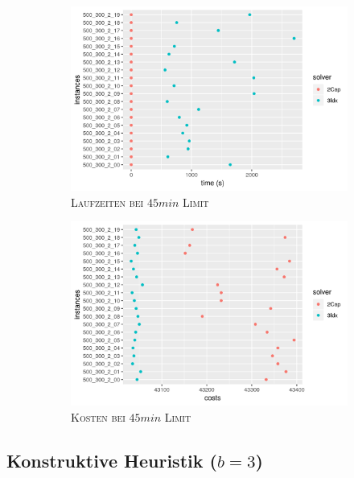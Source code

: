 \begin{figure}[H]
\centering
\begin{subfigure}[b]{0.4\textwidth}
\centering
\includegraphics[width=1.3\textwidth]{img/solver_instance_time_b=2_l_2700s.png}
\caption{\textsc{Laufzeiten bei $45min$ Limit}}
\label{fig:b=2_l_runtimes}
\end{subfigure}
\hfill
\begin{subfigure}[b]{0.4\textwidth}
\centering
\includegraphics[width=1.3\textwidth]{img/solver_instance_cost_b=2_l_2700s.png}
\caption{\textsc{Kosten bei $45min$ Limit}}
\label{fig:b=2_l_costs}
\end{subfigure}
\caption{}
\label{fig:res_plots_b=2_l}
\end{figure}

\subsection{Konstruktive Heuristik ($b = 3$)}
\label{sec:three_cap_heuristic}

